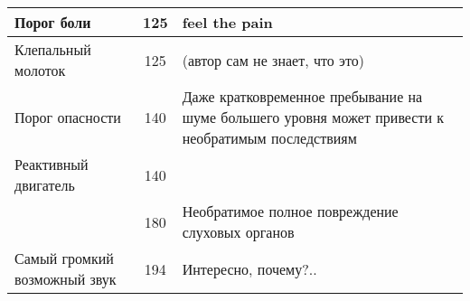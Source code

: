 \begin{center}
\begin{longtable}{|p{}|c|p{}|}
        \hline
        Порог боли & 125 & \small{feel the pain}                          \\
        \hline
        Клепальный молоток & 125 & \small{(автор сам не знает, что это)}          \\
        \hline
        Порог опасности & 140 & \small{Даже кратковременное пребывание на
        шуме большего уровня может привести к необратимым последствиям}                       \\
        \hline
        Реактивный двигатель & 140 &                                                \\
        & 180 & \small{Необратимое полное повреждение
        слуховых органов}                                        \\
        Самый громкий возможный звук & 194 & \small{Интересно, почему?..}                   \\
    \end{longtable}
\end{center}

